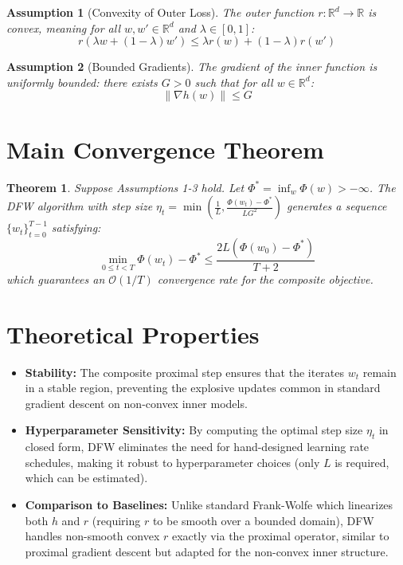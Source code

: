 \documentclass{article}
\newtheorem{assumption}{Assumption}
\newtheorem{theorem}{Theorem}
\begin{document}
\begin{assumption}[Convexity of Outer Loss]
The outer function $r: \mathbb{R}^d \to \mathbb{R}$ is convex, meaning for all $w, w' \in \mathbb{R}^d$ and $\lambda \in [0,1]$:
\begin{equation}
    r(\lambda w + (1-\lambda)w') \leq \lambda r(w) + (1-\lambda) r(w')
\end{equation}
\end{assumption}

\begin{assumption}[Bounded Gradients]
The gradient of the inner function is uniformly bounded: there exists $G > 0$ such that for all $w \in \mathbb{R}^d$:
\begin{equation}
    \|\nabla h(w)\| \leq G
\end{equation}
\end{assumption}

\section*{Main Convergence Theorem}
\begin{theorem}
Suppose Assumptions 1-3 hold. Let $\Phi^* = \inf_w \Phi(w) > -\infty$. The DFW algorithm with step size $\eta_t = \min\left(\frac{1}{L}, \frac{\Phi(w_t) - \Phi^*}{L G^2}\right)$ generates a sequence $\{w_t\}_{t=0}^{T-1}$ satisfying:
\begin{equation}
    \min_{0 \leq t < T} \Phi(w_t) - \Phi^* \leq \frac{2L (\Phi(w_0) - \Phi^*)}{T+2}
\end{equation}
which guarantees an $\mathcal{O}(1/T)$ convergence rate for the composite objective.
\end{theorem}

\section*{Theoretical Properties}
\begin{itemize}
    \item \textbf{Stability:} The composite proximal step ensures that the iterates $w_t$ remain in a stable region, preventing the explosive updates common in standard gradient descent on non-convex inner models.
    \item \textbf{Hyperparameter Sensitivity:} By computing the optimal step size $\eta_t$ in closed form, DFW eliminates the need for hand-designed learning rate schedules, making it robust to hyperparameter choices (only $L$ is required, which can be estimated).
    \item \textbf{Comparison to Baselines:} Unlike standard Frank-Wolfe which linearizes both $h$ and $r$ (requiring $r$ to be smooth over a bounded domain), DFW handles non-smooth convex $r$ exactly via the proximal operator, similar to proximal gradient descent but adapted for the non-convex inner structure.
\end{itemize}
\end{document}
